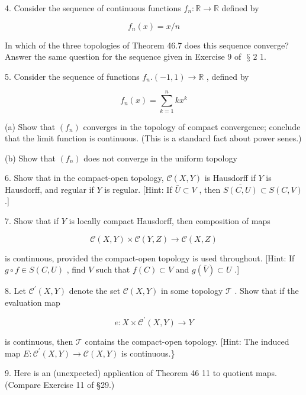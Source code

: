 \documentclass[10pt]{article}
\begin{document}
4. Consider the sequence of continuous functions \({f}_{n} : \mathbb{R} \rightarrow  \mathbb{R}\) defined by

\[
{f}_{n}\left( x\right)  = x/n
\]

In which of the three topologies of Theorem 46.7 does this sequence converge? Answer the same question for the sequence given in Exercise 9 of \(\text{ § }2\) 1.

5. Consider the sequence of functions \({f}_{n}.\left( {-1,1}\right)  \rightarrow  \mathbb{R}\) , defined by

\[
{f}_{n}\left( x\right)  = \mathop{\sum }\limits_{{k = 1}}^{n}k{x}^{k}
\]

(a) Show that \(\left( {f}_{n}\right)\) converges in the topology of compact convergence; conclude that the limit function is continuous. (This is a standard fact about power senes.)

(b) Show that \(\left( {f}_{n}\right)\) does not converge in the uniform topology

6. Show that in the compact-open topology, \(\mathcal{C}\left( {X,Y}\right)\) is Hausdorff if \(Y\) is Hausdorff, and regular if \(Y\) is regular. [Hint: If \(\bar{U} \subset  V\) , then \(\overline{S\left( {C,U}\right) } \subset  S\left( {C,V}\right)\) .]

7. Show that if \(Y\) is locally compact Hausdorff, then composition of maps

\[
\mathcal{C}\left( {X,Y}\right)  \times  \mathcal{C}\left( {Y,Z}\right)  \rightarrow  \mathcal{C}\left( {X,Z}\right)
\]

is continuous, provided the compact-open topology is used throughout. [Hint: If \(g \circ  f \in  S\left( {C,U}\right)\) , find \(V\) such that \(f\left( C\right)  \subset  V\) and \(g\left( \bar{V}\right)  \subset  U\) .]

8. Let \({\mathcal{C}}^{\prime }\left( {X,Y}\right)\) denote the set \(\mathcal{C}\left( {X,Y}\right)\) in some topology \(\mathcal{T}\) . Show that if the evaluation map

\[
e : X \times  {\mathcal{C}}^{\prime }\left( {X,Y}\right)  \rightarrow  Y
\]

is continuous, then \(\mathcal{T}\) contains the compact-open topology. [Hint: The induced map \(E : {\mathcal{C}}^{\prime }\left( {X,Y}\right)  \rightarrow  \mathcal{C}\left( {X,Y}\right)\) is continuous.\}

9. Here is an (unexpected) application of Theorem 46 11 to quotient maps. (Compare Exercise 11 of §29.)
\end{document}
